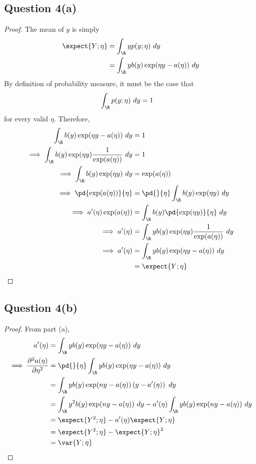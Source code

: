 \documentclass[11pt]{article}
\begin{document}
	\subsection{Question 4(a)}
	\begin{proof}
		The mean of $y$ is simply
		\begin{align}
			\expect{Y;\eta} &= \int_\R y p(y; \eta)\ dy \\
			&= \int_\R y b(y) \exp(\eta y - a(\eta))\ dy
		\end{align}
		By definition of probability measure, it must be the case that 
		\begin{align}
			\int_\R p(y; \eta)\ dy &= 1
		\end{align}
		for every valid $\eta$. Therefore,
		\begin{align}
			\int_\R b(y) \exp(\eta y - a(\eta))\ dy &= 1 \\
			\implies \int_\R b(y) \exp(\eta y) \frac{1}{\exp(a(\eta))}\ dy &= 1 \\
			\implies \int_\R b(y) \exp(\eta y)\ dy &= \exp(a(\eta)) \\
			\implies \pd{\exp(a(\eta))}{\eta} &= \pd{}{\eta} \int_\R b(y) \exp(\eta y)\ dy \\
			\implies a'(\eta) \exp(a(\eta)) &= \int_\R b(y) \pd{\exp(\eta y)}{\eta}\ dy \\
			\implies a'(\eta) &= \int_\R y b(y) \exp(\eta y) \frac{1}{\exp(a(\eta))}\ dy \\
			\implies a'(\eta) &= \int_\R y b(y) \exp(\eta y - a(\eta))\ dy \\
			&= \expect{Y;\eta}
		\end{align}
	\end{proof}
	
	\newpage
	\subsection{Question 4(b)}
	\begin{proof}
		From part (a),
		\begin{align}
			a'(\eta) &= \int_\R y b(y) \exp(\eta y - a(\eta))\ dy \\
			\implies \frac{\partial^2 a(\eta)}{\partial \eta^2} &= \pd{}{\eta} \int_\R y b(y) \exp(\eta y - a(\eta))\ dy \\
			&= \int_\R y b(y) \exp(ny - a(\eta)) \left (
				y - a'(\eta)
			\right)\ dy \\
			&= \int_\R y^2 b(y) \exp(ny - a(\eta))\ dy - a'(\eta) \int_\R y b(y) \exp(ny - a(\eta))\ dy \\
			&= \expect{Y^2; \eta} - a'(\eta) \expect{Y; \eta} \\
			&= \expect{Y^2; \eta} - \expect{Y; \eta}^2 \\
			&= \var{Y; \eta}
		\end{align}
	\end{proof}
	
\end{document}
